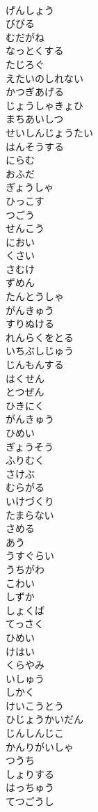 \documentclass[8pt]{extreport}
\begin{document}
\begin{CJK}{UTF8}{min}
\\	げんしょう
\\	びびる
\\	むだがね
\\	なっとくする
\\	たじろぐ
\\	えたいのしれない
\\	かつぎあげる
\\	じょうしゃきょひ
\\	まちあいしつ
\\	せいしんじょうたい
\\	はんそうする
\\	にらむ
\\	おふだ
\\	ぎょうしゃ
\\	ひっこす
\\	つごう
\\	せんこう
\\	におい
\\	くさい
\\	さむけ
\\	ずめん
\\	たんとうしゃ
\\	がんきゅう
\\	すりぬける
\\	れんらくをとる
\\	いちぶしじゅう
\\	じんもんする
\\	はくせん
\\	とつぜん
\\	ひきにく
\\	がんきゅう
\\	ひめい
\\	ぎょうそう
\\	ふりむく
\\	さけぶ
\\	むらがる
\\	いけづくり
\\	たまらない
\\	さめる
\\	あう
\\	うすぐらい
\\	うちがわ
\\	こわい
\\	しずか
\\	しょくば
\\	てっさく
\\	ひめい
\\	けはい
\\	くらやみ
\\	いしゅう
\\	しかく
\\	けいこうとう
\\	ひじょうかいだん
\\	じんしんじこ
\\	かんりがいしゃ
\\	つうち
\\	しょりする
\\	はっちゅう
\\	てつごうし
\end{CJK}
\end{document}
